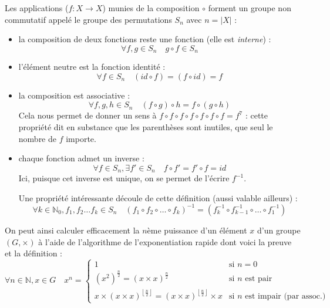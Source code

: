 \documentclass[11pt,a4paper,oneside]{book}
\begin{document}
Les applications ($f:X\rightarrow X$) munies de la composition $\circ$ forment un
groupe non commutatif appelé le groupe des permutations $S_n$ avec $n=|X|$ :
\begin{itemize}
\item la composition de deux fonctions reste une fonction
	(elle est \emph{interne}) :
	\[\forall f,g \in S_n \quad g \circ f \in S_n\]
\item l'élément neutre est la fonction identité :
	\[\forall f\in S_n \quad (id\circ f) = (f\circ id) = f\]
\item la composition est associative :
	\[\forall f, g, h \in S_n \quad (f\circ g)\circ h = f\circ (g\circ h)\]
	Cela nous permet de donner un sens à
	$f\circ f\circ f \circ f\circ f\circ f\circ f=f^7$ : cette propriété
	dit en substance que les parenthèses sont inutiles, que seul le nombre de
	$f$ importe.
\item chaque fonction admet un inverse :
	\[\forall f\in S_n, \exists f'\in S_n \quad f\circ f'=f'\circ f=id\]
	Ici, puisque cet inverse est unique, on se permet de l'écrire $f^{-1}$.

	Une propriété intéressante découle de cette définition
	(aussi valable ailleurs) :
	\[
		\forall k\in\mathbb{N}_0, f_1,f_2\dots f_k \in S_n \quad
		\left(f_1\circ f_2\circ \dots \circ f_k\right)^{-1} =
		\left(f_k^{-1}\circ f_{k-1}^{-1}\circ \dots \circ f_1^{-1}\right)
	\]
\end{itemize}

On peut ainsi calculer efficacement la $n$ème puissance d'un élément $x$ d'un
groupe $(G, \times)$ à l'aide de l'algorithme de l'exponentiation rapide
dont voici la preuve et la définition :
\[
	\forall n \in \mathbb{N}, x \in G \quad
	x^n = \left\{\begin{array}{ll}
		1 &
			\text{si $n=0$} \\
		\left(x^2\right)^{\frac n2} = \left(x\times x\right)^{\frac n2} &
			\text{si $n$ est pair} \\
		x\times \left(x\times x\right)^{\left\lfloor\frac n2\right\rfloor} =
		\left(x\times x\right)^{\left\lfloor\frac n2\right\rfloor}\times x &
			\text{si $n$ est impair (par assoc.)}
	\end{array}\right.
\]
\end{document}
